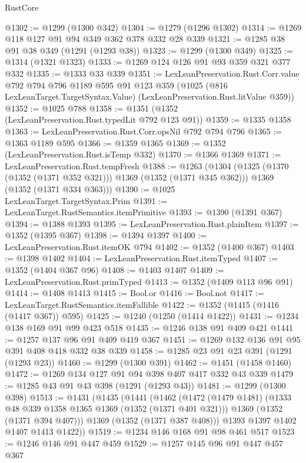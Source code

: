 \begin{lexlean}{RustCore}
\begin{coremodule}
@1302 := @1299 (@1300 @342)
@1304 := @1279 (@1296 @1302)
@1314 := @1269 @118 @127 @91 @94 @349 @362 @378 @332 @28 @339
@1321 := @1285 @38 @91 @38 @349 (@1291 (@1293 @38))
@1323 := @1299 (@1300 @349)
@1325 := @1314 (@1321 @1323)
@1333 := @1269 @124 @126 @91 @93 @359 @321 @377 @332
@1335 := @1333 @33 @339
@1351 := LexLeanPreservation.Rust.Corr.value
    @792
    @794
    @796
    @1189
    @595
    @91
    @123
    @359
    (@1025 (@816 LexLeanTarget.TargetSyntax.Value) (LexLeanPreservation.Rust.litValue @359))
@1352 := @1025 @788
@1358 := @1351 (@1352 (LexLeanPreservation.Rust.typedLit @792 @123 @91))
@1359 := @1335 @1358
@1363 := LexLeanPreservation.Rust.Corr.opsNil @792 @794 @796
@1365 := @1363 @1189 @595
@1366 := @1359 @1365
@1369 := @1352 (LexLeanPreservation.Rust.isTemp @332)
@1370 := @1366 @1369
@1371 := LexLeanPreservation.Rust.tempFresh
@1388 := @1263
    (@1304
      (@1325 (@1370 (@1352 (@1371 @352 @321))) @1369 (@1352 (@1371 @345 @362)))
      @1369
      (@1352 (@1371 @334 @363)))
@1390 := @1025 LexLeanTarget.TargetSyntax.Prim
@1391 := LexLeanTarget.RustSemantics.itemPrimitive
@1393 := @1390 (@1391 @367)
@1394 := @1388 @1393
@1395 := LexLeanPreservation.Rust.plainItem
@1397 := @1352 (@1395 @367)
@1398 := @1394 @1397
@1400 := LexLeanPreservation.Rust.itemOK @794
@1402 := @1352 (@1400 @367)
@1403 := @1398 @1402
@1404 := LexLeanPreservation.Rust.itemTyped
@1407 := @1352 (@1404 @367 @96)
@1408 := @1403 @1407
@1409 := LexLeanPreservation.Rust.primTyped
@1413 := @1352 (@1409 @113 @96 @91)
@1414 := @1408 @1413
@1415 := Bool.or
@1416 := Bool.not
@1417 := LexLeanTarget.RustSemantics.itemFallible
@1422 := @1352 (@1415 (@1416 (@1417 @367)) @595)
@1425 := @1240 (@1250 (@1414 @1422))
@1431 := @1234 @138 @169 @91 @99 @423 @518
@1435 := @1246 @138 @91 @409 @421
@1441 := @1257 @137 @96 @91 @409 @419 @367
@1451 := @1269 @132 @136 @91 @95 @391 @408 @418 @332 @38 @339
@1458 := @1285 @23 @91 @23 @391 (@1291 (@1293 @23))
@1460 := @1299 (@1300 @391)
@1462 := @1451 (@1458 @1460)
@1472 := @1269 @134 @127 @91 @94 @398 @407 @417 @332 @43 @339
@1479 := @1285 @43 @91 @43 @398 (@1291 (@1293 @43))
@1481 := @1299 (@1300 @398)
@1513 := @1431
    (@1435
      (@1441
        (@1462
          (@1472
            (@1479 @1481)
            (@1333 @48 @339 @1358 @1365 @1369 (@1352 (@1371 @401 @321)))
            @1369
            (@1352 (@1371 @394 @407)))
          @1369
          (@1352 (@1371 @387 @408)))
        @1393
        @1397
        @1402
        @1407
        @1413
        @1422))
@1519 := @1234 @146 @168 @91 @98 @461 @517
@1523 := @1246 @146 @91 @447 @459
@1529 := @1257 @145 @96 @91 @447 @457 @367

\end{coremodule}
\end{lexlean}
